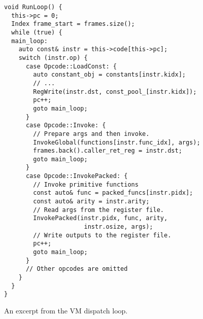 \begin{figure}[h]
\begin{verbatim}
void RunLoop() {
  this->pc = 0;
  Index frame_start = frames.size();
  while (true) {
  main_loop:
    auto const& instr = this->code[this->pc];
    switch (instr.op) {
      case Opcode::LoadConst: {
        auto constant_obj = constants[instr.kidx];
        // ...
        RegWrite(instr.dst, const_pool_[instr.kidx]);
        pc++;
        goto main_loop;
      }
      case Opcode::Invoke: {
        // Prepare args and then invoke.
        InvokeGlobal(functions[instr.func_idx], args);
        frames.back().caller_ret_reg = instr.dst;
        goto main_loop;
      }
      case Opcode::InvokePacked: {
        // Invoke primitive functions
        const auto& func = packed_funcs[instr.pidx];
        const auto& arity = instr.arity;
        // Read args from the register file.
        InvokePacked(instr.pidx, func, arity,
                      instr.osize, args);
        // Write outputs to the register file.
        pc++;
        goto main_loop;
      }
      // Other opcodes are omitted
    }
  }
}
\end{verbatim}
\caption{An excerpt from the VM dispatch loop.}
\label{fig:vm_interpreter}
\end{figure}
